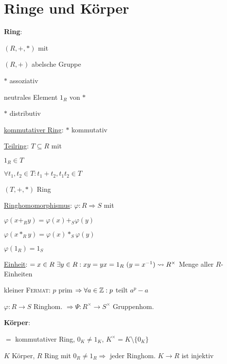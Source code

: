 \section{\label{sec:RingeKoerper}Ringe und Körper}

  \textbf{Ring}:
  \begin{items}
    \item $(R,+,*)$ mit
    \begin{enumeration}
      \item $(R,+)$ abelsche Gruppe
      \item $*$ assoziativ
      \item neutrales Element $1_R$ von $*$
      \item $*$ distributiv
    \end{enumeration}
    \item \underline{kommutativer Ring}: $*$ kommutativ
    \item \underline{Teilring}: $T \subseteq R$ mit
      \begin{enumeration}
        \item $1_R \in T$
        \item $\forall  t_1, t_2 \in T: t_1+t_2, t_1t_2 \in T$
        \item $(T,+,*)$ Ring
      \end{enumeration}
    \item \underline{Ringhomomorphismus}: $\varphi: R \Rightarrow S$ mit
    \begin{enumeration}
      \item $\varphi(x +_R y) = \varphi(x) +_S \varphi(y)$
      \item $\varphi(x *_R y) = \varphi(x) *_S \varphi(y)$
      \item $\varphi(1_R) = 1_S$
    \end{enumeration}
    \item \underline{Einheit}: $= x \in R \ \exists y \in R: xy = yx = 1_R \ (y = x^{-1}) \\* \leadsto R^{\times}$ Menge aller $R$-Einheiten
    \item kleiner \textsc{Fermat}: $p$ prim $\Rightarrow \forall a \in \mathbb{Z}: p$ teilt $a^p-a$
    \item $\varphi: R \rightarrow S$ Ringhom. $\Rightarrow \Psi: R^{\times} \rightarrow S^{\times}$ Gruppenhom.
  \end{items}

  \textbf{Körper}:
  \begin{items}
    \item $=$ kommutativer Ring, $0_K \neq 1_K$, $K^{\times} = K \setminus \{ 0_K\}$
    \item $K$ Körper, $R$ Ring mit $0_R \neq 1_R \Rightarrow$ jeder Ringhom. $K \rightarrow R$ ist injektiv
  \end{items}


